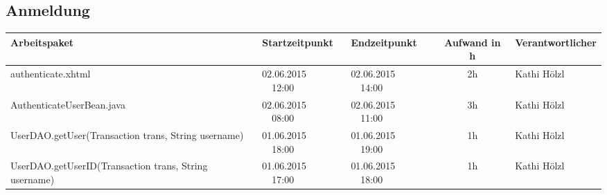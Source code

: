 \begin{landscape}
\subsection{Anmeldung}
\begin{tabular}{|p{10.3cm}|p{3.2cm}|p{3.2cm}|c|p{3.5cm}|}
	\hline  \textbf{Arbeitspaket} & \textbf{Startzeitpunkt} & \textbf{Endzeitpunkt} & \textbf{Aufwand in h} & \textbf{Verantwortlicher} \\ 
	\hline   authenticate.xhtml                                   & 02.06.2015 \ \ 12:00     & 02.06.2015 \ \ 14:00     &      2h               & Kathi Hölzl\\
	\hline   AuthenticateUserBean.java                            & 02.06.2015 \ \ 08:00     & 02.06.2015 \ \ 11:00     &      3h               & Kathi Hölzl\\
	\hline   UserDAO.getUser(Transaction trans, String username)  & 01.06.2015 \ \ 18:00     & 01.06.2015 \ \ 19:00     &      1h               & Kathi Hölzl\\
	\hline   UserDAO.getUserID(Transaction trans, String username)& 01.06.2015 \ \ 17:00     & 01.06.2015 \ \ 18:00     &      1h               & Kathi Hölzl\\
	\hline 
\end{tabular} \ \\
\ \\


\end{landscape}
